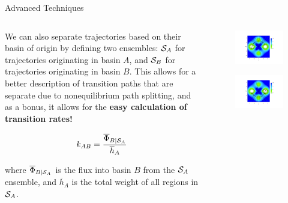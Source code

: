 \documentclass[final]{beamer}
\begin{document}
\begin{columns}[t]
\begin{column}{.25 \linewidth}
\begin{block}{Advanced Techniques}
	  \begin{columns}[t]
	    \begin{column}{.45\linewidth}

	      We can also separate trajectories based on their basin of origin by defining two ensembles:  ${\cal S}_A$ for trajectories originating in basin $A$, and ${\cal S}_B$ for trajectories originating in basin $B$.
	  This allows for a better description of transition paths that are separate due to nonequilibrium path splitting, and as a bonus, it allows for the \textbf{easy calculation of transition rates!}

	  \begin{equation*}
	    \label{eq:rate}
	    k_{AB} = \frac{\overline{\Phi}_{B \mid {\cal S}_A}}{\overline{h}_A}
	  \end{equation*}

	  where $\overline{\Phi}_{B \mid {\cal S}_A}$ is the flux into basin $B$ from the ${\cal S}_A$ ensemble, and $\overline{h}_A$ is the total weight of all regions in ${\cal S}_A$.
	    \end{column}
	    \begin{column}{.45\linewidth}
	      \begin{figure}
 		\includegraphics[width=0.5\linewidth]{images/contvorf.pdf}
	      \end{figure}
	      \begin{figure}
 		\includegraphics[width=0.5\linewidth]{images/contvorr.pdf}
	      \end{figure}
	    \end{column}
	  \end{columns}
	  

\end{block}
\end{column}
\end{columns}
\end{document}
